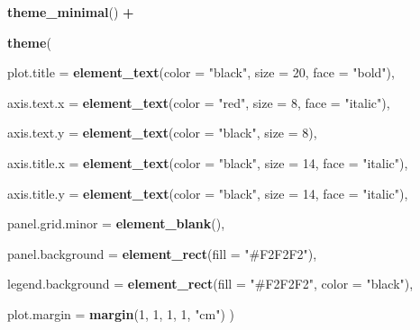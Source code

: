 \documentclass[
]{article}
\newenvironment{Shaded}{\begin{snugshade}}{\end{snugshade}}
\newcommand{\AttributeTok}[1]{\textcolor[rgb]{0.13,0.29,0.53}{#1}}
\newcommand{\DecValTok}[1]{\textcolor[rgb]{0.00,0.00,0.81}{#1}}
\newcommand{\FunctionTok}[1]{\textcolor[rgb]{0.13,0.29,0.53}{\textbf{#1}}}
\newcommand{\NormalTok}[1]{#1}
\newcommand{\SpecialCharTok}[1]{\textcolor[rgb]{0.81,0.36,0.00}{\textbf{#1}}}
\newcommand{\StringTok}[1]{\textcolor[rgb]{0.31,0.60,0.02}{#1}}
\begin{document}
\begin{Shaded}
\begin{Highlighting}[]
  \FunctionTok{theme\_minimal}\NormalTok{() }\SpecialCharTok{+}
  
  \FunctionTok{theme}\NormalTok{(}
    
    \AttributeTok{plot.title =} \FunctionTok{element\_text}\NormalTok{(}\AttributeTok{color =} \StringTok{"black"}\NormalTok{, }\AttributeTok{size =} \DecValTok{20}\NormalTok{, }\AttributeTok{face =} \StringTok{"bold"}\NormalTok{),}
    
    \AttributeTok{axis.text.x =} \FunctionTok{element\_text}\NormalTok{(}\AttributeTok{color =} \StringTok{"red"}\NormalTok{, }\AttributeTok{size =} \DecValTok{8}\NormalTok{, }\AttributeTok{face =} \StringTok{"italic"}\NormalTok{),}
    
    \AttributeTok{axis.text.y =} \FunctionTok{element\_text}\NormalTok{(}\AttributeTok{color =} \StringTok{"black"}\NormalTok{, }\AttributeTok{size =} \DecValTok{8}\NormalTok{),}
    
    \AttributeTok{axis.title.x =} \FunctionTok{element\_text}\NormalTok{(}\AttributeTok{color =} \StringTok{"black"}\NormalTok{, }\AttributeTok{size =} \DecValTok{14}\NormalTok{, }\AttributeTok{face =} \StringTok{"italic"}\NormalTok{),}
    
    \AttributeTok{axis.title.y =} \FunctionTok{element\_text}\NormalTok{(}\AttributeTok{color =} \StringTok{"black"}\NormalTok{, }\AttributeTok{size =} \DecValTok{14}\NormalTok{, }\AttributeTok{face =} \StringTok{"italic"}\NormalTok{),}
    
    \AttributeTok{panel.grid.minor =} \FunctionTok{element\_blank}\NormalTok{(),}
    
    \AttributeTok{panel.background =} \FunctionTok{element\_rect}\NormalTok{(}\AttributeTok{fill =} \StringTok{"\#F2F2F2"}\NormalTok{),}
    
    \AttributeTok{legend.background =} \FunctionTok{element\_rect}\NormalTok{(}\AttributeTok{fill =} \StringTok{"\#F2F2F2"}\NormalTok{, }\AttributeTok{color =} \StringTok{"black"}\NormalTok{),}
    
    \AttributeTok{plot.margin =} \FunctionTok{margin}\NormalTok{(}\DecValTok{1}\NormalTok{, }\DecValTok{1}\NormalTok{, }\DecValTok{1}\NormalTok{, }\DecValTok{1}\NormalTok{, }\StringTok{"cm"}\NormalTok{)}
\NormalTok{  )}
\end{Highlighting}
\end{Shaded}
\end{document}
